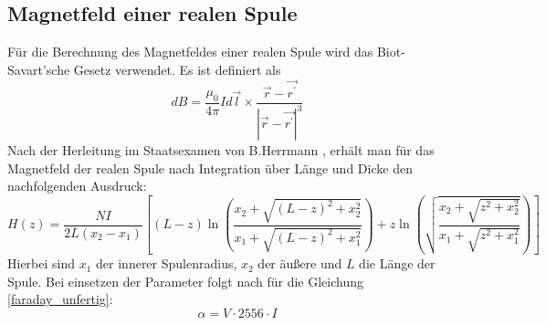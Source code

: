 \subsection{Magnetfeld einer realen Spule}
Für die Berechnung des Magnetfeldes einer realen Spule wird das Biot-Savart'sche Gesetz verwendet. Es ist definiert als 
\begin{equation}
\label{biot-savart}
d B = \frac{\mu_0}{4 \pi} I d \vec{l} \times \frac{\vec{r}-\vec{r^\prime}}{\left|\vec{r}-\vec{r^\prime}\right|^3}
\end{equation}
Nach der Herleitung im Staatsexamen von B.Herrmann \cite{staatsex_farpock}, erhält man für das Magnetfeld der realen Spule nach Integration über Länge und Dicke den nachfolgenden Ausdruck:
\begin{equation}
H(z) = \frac{N I}{2L(x_2-x_1)}\left[
(L-z) \ln\left(\frac{x_2 + \sqrt{(L-z)^2+x_2^2}}{x_1 + \sqrt{(L-z)^2+x_1^2}}\right) + z \ln \left(\sqrt{\frac{x_2 + \sqrt{z^2 +x_2^2}}{x_1 + \sqrt{z^2 +x_1^2}}}\right) 
\right]
\label{realFormel}
\end{equation}
Hierbei sind $x_1$ der innerer Spulenradius, $x_2$ der äußere und $L$ die Länge der Spule. Bei einsetzen der Parameter folgt nach \cite{staatsex_farpock} für die Gleichung \ref{faraday_unfertig}: 
\begin{equation}
\alpha = V \cdot 2556 \cdot I 
\label{r41}
\end{equation}